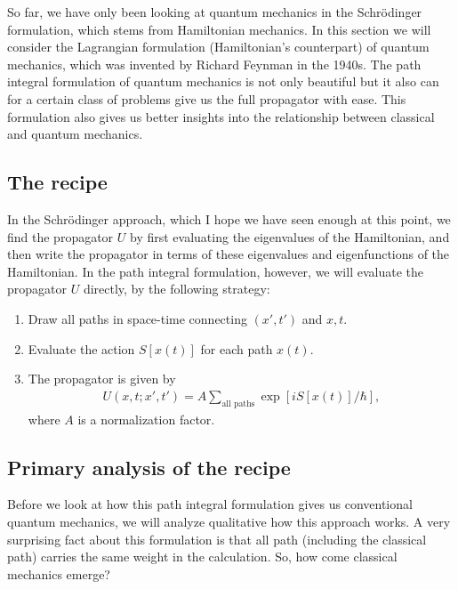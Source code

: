 \documentclass{book}
\theoremstyle{definition}
\newcommand{\lb}{\left[}
\newcommand{\rb}{\right]}
\begin{document}
So far, we have only been looking at quantum mechanics in the Schr\"{o}dinger formulation, which stems from Hamiltonian mechanics. In this section we will consider the Lagrangian formulation (Hamiltonian's counterpart) of quantum mechanics, which was invented by Richard Feynman in the 1940s. The path integral formulation of quantum mechanics is not only beautiful but it also can for a certain class of problems give us the full propagator with ease. This formulation also gives us better insights into the relationship between classical and quantum mechanics. \\


\subsection{The recipe}


In the Schr\"{o}dinger approach, which I hope we have seen enough at this point, we find the propagator $U$ by first evaluating the eigenvalues of the Hamiltonian, and then write the propagator in terms of these eigenvalues and eigenfunctions of the Hamiltonian. In the path integral formulation, however, we will evaluate the propagator $U$ directly, by the following strategy:
\begin{enumerate}
	\item Draw all paths in space-time connecting $(x',t')$ and $x,t$.
	\item Evaluate the action $S[x(t)]$ for each path $x(t)$.
	\item The propagator is given by
	\begin{align}
	U(x,t;x',t') = A \sum_{\text{all paths}} \exp\lb iS[x(t)]/\hbar \rb,
	\end{align}
	where $A$ is a normalization factor. 
\end{enumerate}



\subsection{Primary analysis of the recipe}


Before we look at how this path integral formulation gives us conventional quantum mechanics, we will analyze qualitative how this approach works. A very surprising fact about this formulation is that all path (including the classical path) carries the same weight in the calculation. So, how come classical mechanics emerge?\\
\end{document}
